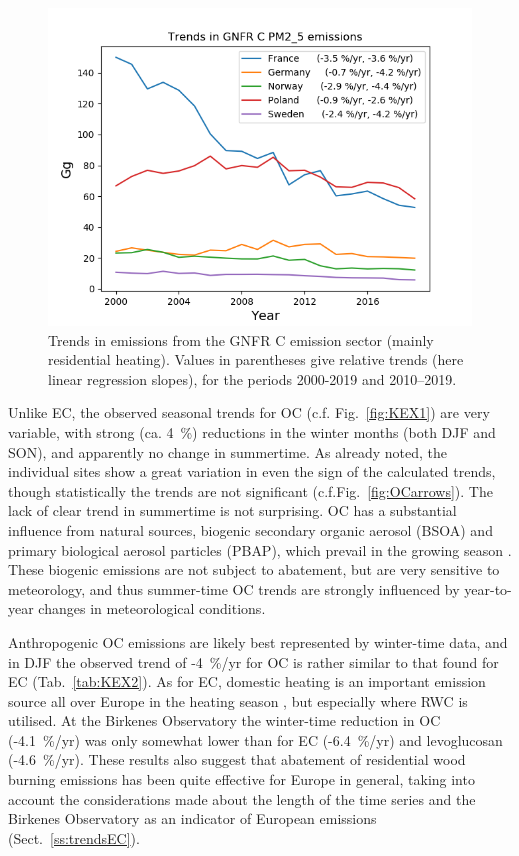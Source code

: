 \begin{figure}
    \centering
    \includegraphics[width=12cm,trim=0 0 0 1.5cm,clip]{FIGS_TRENDS/PlotEmisTrends_PM2_5.png}
    \parbox{12cm}{
    \caption{Trends in \pmfine emissions from the GNFR C emission sector (mainly residential heating). Values in parentheses give relative trends (here linear regression slopes), for the periods 2000-2019 and 2010--2019.
    \label{fig:gnfrCtrends}}}
\end{figure}

 

Unlike EC, the observed seasonal trends for OC (c.f. Fig.~\ref{fig:KEX1}) are very variable, with strong (ca. 4~\%) reductions in the winter months (both DJF and SON), and apparently no change in summertime. As already noted, the individual sites show a great variation in even the sign of the calculated trends, though statistically the trends are not significant (c.f.Fig.~\ref{fig:OCarrows}). The lack of clear trend in summertime is not surprising. 
OC has a substantial influence from
natural sources, biogenic secondary organic aerosol (BSOA) and primary
biological aerosol particles (PBAP), which prevail in the growing season \citep[e.g.][]{Gelencser:CARB,Yttri2019}.
These biogenic emissions are not subject to abatement, but are very sensitive to meteorology, and thus summer-time OC trends are strongly influenced by year-to-year changes in meteorological conditions.

Anthropogenic OC emissions
are likely best represented by winter-time data, and in DJF the observed trend of -4~\%/yr for OC is rather similar to that found for EC (Tab.~\ref{tab:KEX2}). As
for EC, domestic heating is an important emission source 
all over Europe in the heating season
\citep[e.g.][]{Yttri2019}, but especially where RWC is utilised.
At the Birkenes
Observatory the winter-time reduction in OC (-4.1~\%/yr) was only somewhat
lower than for EC (-6.4~\%/yr) and levoglucosan (-4.6~\%/yr).
These results also suggest
that abatement of residential wood burning emissions has been quite
effective for Europe in general, taking into account the considerations
made about the length of the time series and the Birkenes Observatory as
an indicator of European emissions (Sect.~\ref{ss:trendsEC}).  


